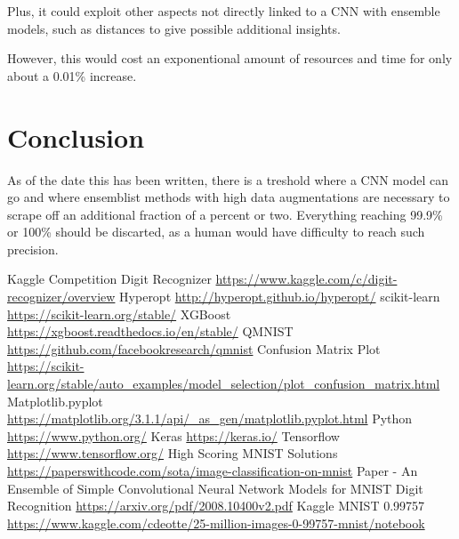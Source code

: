 \documentclass{article}
\begin{document}
Plus, it could exploit other aspects not directly linked to a CNN with ensemble
models, such as distances to give possible additional insights.

However, this would cost an exponentional amount of resources and time for only
about a 0.01\% increase.


\section{Conclusion}
As of the date this has been written, there is a treshold where a CNN model can
go and where ensemblist methods with high data augmentations are necessary to
scrape off an additional fraction of a percent or two. Everything reaching
99.9\% or 100\% should be discarted, as a human would have difficulty to reach
such precision.




\begin{thebibliography}{99}  
   Kaggle Competition Digit Recognizer \url{https://www.kaggle.com/c/digit-recognizer/overview}
   Hyperopt \url{http://hyperopt.github.io/hyperopt/}
   scikit-learn \url{https://scikit-learn.org/stable/}
   XGBoost \url{https://xgboost.readthedocs.io/en/stable/}
   QMNIST \url{https://github.com/facebookresearch/qmnist}
   Confusion Matrix Plot \url{https://scikit-learn.org/stable/auto_examples/model_selection/plot_confusion_matrix.html}
   Matplotlib.pyplot \url{https://matplotlib.org/3.1.1/api/_as_gen/matplotlib.pyplot.html}
   Python \url{https://www.python.org/}
   Keras \url{https://keras.io/}
   Tensorflow \url{https://www.tensorflow.org/}
   High Scoring MNIST Solutions \url{https://paperswithcode.com/sota/image-classification-on-mnist}
   Paper - An Ensemble of Simple Convolutional Neural Network Models for MNIST Digit Recognition
  \url{https://arxiv.org/pdf/2008.10400v2.pdf}
   Kaggle MNIST 0.99757 \url{https://www.kaggle.com/cdeotte/25-million-images-0-99757-mnist/notebook}
\end{thebibliography}
\end{document}
